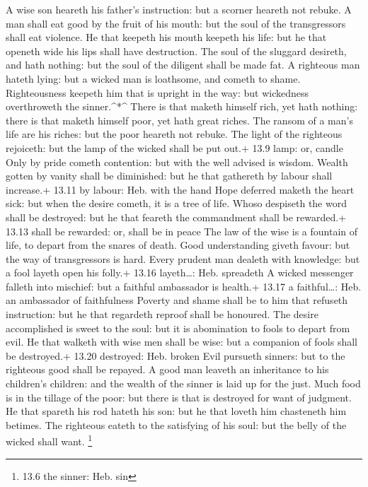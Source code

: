  A wise son heareth his father's instruction: but a scorner
heareth not rebuke.  A man shall eat good by the fruit of
his mouth: but the soul of the transgressors shall eat violence.
 He that keepeth his mouth keepeth his life: but he that
openeth wide his lips shall have destruction.  The soul of
the sluggard desireth, and hath nothing: but the soul of the diligent
shall be made fat.  A righteous man hateth lying: but a
wicked man is loathsome, and cometh to shame.  Righteousness
keepeth him that is upright in the way: but wickedness overthroweth the
sinner.\^{}*\^{}  There is that maketh himself rich, yet
hath nothing: there is that maketh himself poor, yet hath great riches.
 The ransom of a man's life are his riches: but the poor
heareth not rebuke.  The light of the righteous rejoiceth:
but the lamp of the wicked shall be put out.+ 13.9 lamp: or, candle
 Only by pride cometh contention: but with the well advised
is wisdom.  Wealth gotten by vanity shall be diminished:
but he that gathereth by labour shall increase.+ 13.11 by labour: Heb.
with the hand  Hope deferred maketh the heart sick: but
when the desire cometh, it is a tree of life.  Whoso
despiseth the word shall be destroyed: but he that feareth the
commandment shall be rewarded.+ 13.13 shall be rewarded: or, shall be in
peace  The law of the wise is a fountain of life, to depart
from the snares of death.  Good understanding giveth
favour: but the way of transgressors is hard.  Every
prudent man dealeth with knowledge: but a fool layeth open his folly.+
13.16 layeth\ldots: Heb. spreadeth  A wicked messenger
falleth into mischief: but a faithful ambassador is health.+ 13.17 a
faithful\ldots: Heb. an ambassador of faithfulness  Poverty
and shame shall be to him that refuseth instruction: but he that
regardeth reproof shall be honoured.  The desire
accomplished is sweet to the soul: but it is abomination to fools to
depart from evil.  He that walketh with wise men shall be
wise: but a companion of fools shall be destroyed.+ 13.20 destroyed:
Heb. broken  Evil pursueth sinners: but to the righteous
good shall be repayed.  A good man leaveth an inheritance
to his children's children: and the wealth of the sinner is laid up for
the just.  Much food is in the tillage of the poor: but
there is that is destroyed for want of judgment.  He that
spareth his rod hateth his son: but he that loveth him chasteneth him
betimes.  The righteous eateth to the satisfying of his
soul: but the belly of the wicked shall want. \footnote{13.6 the sinner:
  Heb. sin}

